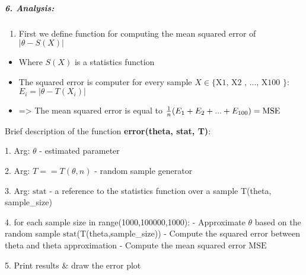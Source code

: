 \documentclass[11pt]{article}
\providecommand{\tightlist}{%
      \setlength{\itemsep}{0pt}\setlength{\parskip}{0pt}}
\begin{document}
\vspace{40px}
    \hypertarget{analysis}{%
\subparagraph{6. Analysis:}\label{analysis}}

\begin{enumerate}
\def\labelenumi{\arabic{enumi}.}
\tightlist
\item
  First we define function for computing the mean squared error of
  \(|\theta - S(X)|\)
\end{enumerate}

\begin{itemize}
\tightlist
\item
  Where \(S(X)\) is a statistics function
\item
  The squared error is computer for every sample
  \(X \in \text{\{ X1, X2 , ..., X100 \}}\): \(E_i = |\theta - T(X_i)|\)
\item
  =\textgreater{} The mean squared error is equal to
  \(\space\frac{1}{n}(E_1 + E_2 + ... + E_{100}) = \text{MSE}\)
\end{itemize}

    Brief description of the function \textbf{error(theta, stat, T)}: \newline

    1. Arg: \(\theta\) - estimated parameter \newline

    2. Arg: \(T == T(\theta,n)\) - random sample generator \newline

    3. Arg: \(\text{stat}\) - a reference to the statistics function over a sample T(theta, sample\_size) \newline
    
    4. for each sample size in range(1000,100000,1000): \newline
    \space\space - Approximate \(\theta\) based on the random sample \(\text{stat}\)(T(theta,sample\_size)) \newline
    \space\space - Compute the squared error between theta and theta approximation \newline
    \space\space - Compute the mean squared error \(\text{MSE}\) \newline

    5. Print results \& draw the error plot \newline\newline\newline
\end{document}
